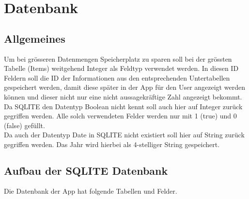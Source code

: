 \section{Datenbank}

\subsection{Allgemeines}

Um bei grösseren Datenmengen Speicherplatz zu sparen soll bei der grössten Tabelle (Items) weitgehend Integer als Feldtyp verwendet werden. In diesen ID Feldern soll die ID der Informationen aus den entsprechenden Untertabellen gespeichert werden, damit diese später in der App für den User angezeigt werden können und dieser nicht nur eine nicht aussagekräftige Zahl angezeigt bekommt.\\

Da SQLITE den Datentyp Boolean nicht kennt soll auch hier auf Integer zurück gegriffen werden. Alle solch verwendeten Felder werden nur mit 1 (true) und 0 (false) gefüllt.\\

Da auch der Datentyp Date in SQLITE nicht existiert soll hier auf String zurück gegriffen werden. Das Jahr wird hierbei als 4-stelliger String gespeichert. 

\subsection{Aufbau der SQLITE Datenbank}

Die Datenbank der App hat folgende Tabellen und Felder.


